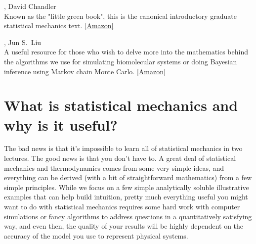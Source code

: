 \documentclass[english,course]{lecture}
\begin{document}
, David Chandler \\
Known as the "little green book", this is the canonical introductory graduate statistical mechanics text.
\href{https://www.amazon.com/Introduction-Modern-Statistical-Mechanics-Chandler/dp/0195042778}{[Amazon]}

, Jun S.\ Liu \\
A useful resource for those who wish to delve more into the mathematics behind the algorithms we use for simulating biomolecular systems or doing Bayesian inference using Markov chain Monte Carlo.
\href{https://www.amazon.com/Strategies-Scientific-Computing-Springer-Statistics/dp/0387763694}{[Amazon]}

\vfill
\eject



\section{What is statistical mechanics and why is it useful?}

The bad news is that it's impossible to learn all of statistical mechanics in two lectures.
The good news is that you don't have to.
A great deal of statistical mechanics and thermodynamics comes from some very simple ideas, and everything can be derived (with a bit of straightforward mathematics) from a few simple principles.
While we focus on a few simple analytically soluble illustrative examples that can help build intuition, pretty much everything useful you might want to do with statistical mechanics requires some hard work with computer simulations or fancy algorithms to address questions in a quantitatively satisfying way, and even then, the quality of your results will be highly dependent on the accuracy of the model you use to represent physical systems.
\end{document}
